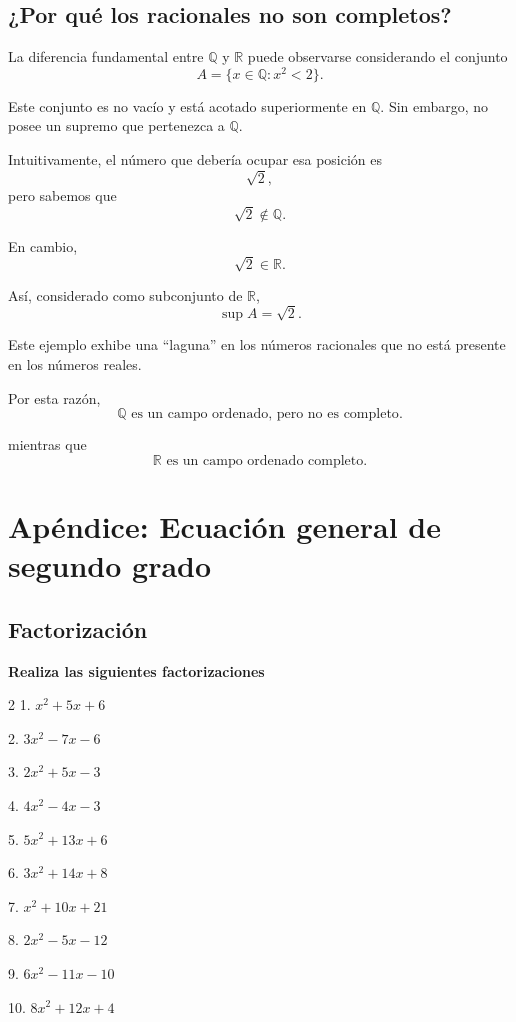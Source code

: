 \documentclass[12pt]{article}
\begin{document}
{%
\subsection{¿Por qué los racionales no son completos?}

La diferencia fundamental entre $\mathbb{Q}$ y $\mathbb{R}$ puede
observarse considerando el conjunto
\[
A=\{x\in\mathbb{Q}:x^2<2\}.
\]

Este conjunto es no vacío y está acotado superiormente en $\mathbb{Q}$.
Sin embargo, no posee un supremo que pertenezca a $\mathbb{Q}$.

Intuitivamente, el número que debería ocupar esa posición es
\[
\sqrt{2},
\]
pero sabemos que
\[
\sqrt{2}\notin\mathbb{Q}.
\]

En cambio,
\[
\sqrt{2}\in\mathbb{R}.
\]

Así, considerado como subconjunto de $\mathbb{R}$,
\[
\sup A=\sqrt{2}.
\]

Este ejemplo exhibe una ``laguna'' en los números racionales que no está
presente en los números reales.

Por esta razón,
\[
\boxed{\mathbb{Q}\text{ es un campo ordenado, pero no es completo}.}
\]

mientras que
\[
\boxed{\mathbb{R}\text{ es un campo ordenado completo}.}
\]
\section{Ap\'endice: Ecuación general de segundo grado}

\subsection{Factorización}
\textbf{Realiza las siguientes factorizaciones}

\begin{multicols}{2}
1. $x^2 + 5x + 6$

2. $3x^2 - 7x - 6$

3. $2x^2 + 5x - 3$

4. $4x^2 - 4x - 3$

5. $5x^2 + 13x + 6$

6. $3x^2 + 14x + 8$

7. $x^2 + 10x + 21$

8. $2x^2 - 5x - 12$

9. $6x^2 - 11x - 10$

10. $8x^2 + 12x + 4$


\end{multicols}}
\end{document}
